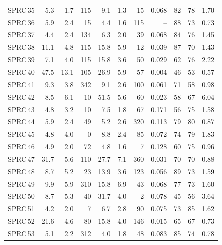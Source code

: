 \documentclass{ab}
\begin{document}
\begin{table}
\begin{tabular}{l|r|r|r|r|r|r|r|r|r|r}
 SPRC\,35&   5.3 &    1.7 &   115 &    9.1 &    1.3 &    15 &  0.068 &     82 &     78 &   1.70 \\
 SPRC\,36&   5.9 &    2.4 &    15 &    4.4 &    1.6 &   115 &     -- &     88 &     73 &   0.73 \\
 SPRC\,37&   4.4 &    2.4 &   134 &    6.3 &    2.0 &    39 &  0.068 &     84 &     76 &   1.45 \\
 SPRC\,38&  11.1 &    4.8 &   115 &   15.8 &    5.9 &    12 &  0.039 &     87 &     70 &   1.43 \\
 SPRC\,39&   7.1 &    4.0 &   115 &   15.8 &    3.6 &    50 &  0.029 &     62 &     76 &   2.22 \\
 SPRC\,40&  47.5 &   13.1 &   105 &   26.9 &    5.9 &    57 &  0.004 &     46 &     53 &   0.57 \\
 SPRC\,41&   9.3 &    3.8 &   342 &    9.1 &    2.6 &   100 &  0.061 &     71 &     58 &   0.98 \\
 SPRC\,42&   8.5 &    6.1 &    10 &   51.5 &    5.6 &    60 &  0.023 &     58 &     67 &   6.04 \\
 SPRC\,43&   4.8 &    3.2 &    10 &    7.5 &    1.8 &    67 &  0.171 &     56 &     75 &   1.58 \\
 SPRC\,44&   5.9 &    2.4 &    49 &    5.2 &    2.6 &   320 &  0.113 &     79 &     80 &   0.87 \\
 SPRC\,45&   4.8 &    4.0 &     0 &    8.8 &    2.4 &    85 &  0.072 &     74 &     79 &   1.83 \\
 SPRC\,46&   4.9 &    2.0 &    72 &    4.8 &    1.6 &     7 &  0.128 &     60 &     75 &   0.96 \\
 SPRC\,47&  31.7 &    5.6 &   110 &   27.7 &    7.1 &   360 &  0.031 &     70 &     70 &   0.88 \\
 SPRC\,48&   8.7 &    5.2 &    23 &   13.9 &    3.6 &   123 &  0.056 &     89 &     73 &   1.59 \\
 SPRC\,49&   9.9 &    5.9 &   310 &   15.8 &    6.9 &    43 &  0.068 &     77 &     73 &   1.60 \\
 SPRC\,50&   8.7 &    5.3 &    40 &   31.7 &    4.0 &     2 &  0.078 &     45 &     56 &   3.64 \\
 SPRC\,51&   4.2 &    2.0 &     7 &    6.7 &    2.8 &    90 &  0.075 &     73 &     85 &   1.62 \\
 SPRC\,52&  21.6 &    4.6 &    80 &   15.8 &    4.0 &   146 &  0.015 &     65 &     67 &   0.73 \\
 SPRC\,53&   5.1 &    2.2 &   312 &    4.0 &    1.8 &    48 &  0.083 &     85 &     74 &   0.78 \\

\end{tabular}
\end{table}
\end{document}
